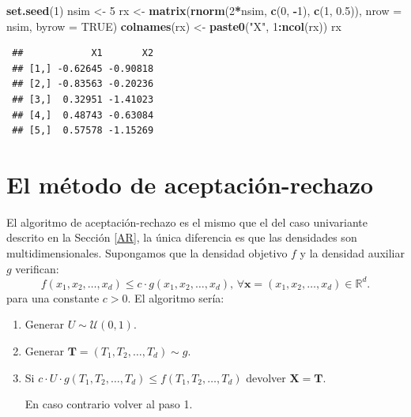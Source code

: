 \documentclass[
  spanish,
  10pt,
]{book}
\newenvironment{Shaded}{\begin{snugshade}}{\end{snugshade}}
\newcommand{\AttributeTok}[1]{\textcolor[rgb]{0.13,0.29,0.53}{#1}}
\newcommand{\ConstantTok}[1]{\textcolor[rgb]{0.56,0.35,0.01}{#1}}
\newcommand{\DecValTok}[1]{\textcolor[rgb]{0.00,0.00,0.81}{#1}}
\newcommand{\FloatTok}[1]{\textcolor[rgb]{0.00,0.00,0.81}{#1}}
\newcommand{\FunctionTok}[1]{\textcolor[rgb]{0.13,0.29,0.53}{\textbf{#1}}}
\newcommand{\NormalTok}[1]{#1}
\newcommand{\OtherTok}[1]{\textcolor[rgb]{0.56,0.35,0.01}{#1}}
\newcommand{\SpecialCharTok}[1]{\textcolor[rgb]{0.81,0.36,0.00}{\textbf{#1}}}
\newcommand{\StringTok}[1]{\textcolor[rgb]{0.31,0.60,0.02}{#1}}
\renewcommand{\mathbf}[1]{\symbf{#1}}
\theoremstyle{break}
\theoremstyle{nonumberplain}
\begin{document}
\begin{Shaded}
\begin{Highlighting}[]
\FunctionTok{set.seed}\NormalTok{(}\DecValTok{1}\NormalTok{)}
\NormalTok{nsim }\OtherTok{\textless{}{-}} \DecValTok{5}
\NormalTok{rx }\OtherTok{\textless{}{-}} \FunctionTok{matrix}\NormalTok{(}\FunctionTok{rnorm}\NormalTok{(}\DecValTok{2}\SpecialCharTok{*}\NormalTok{nsim, }\FunctionTok{c}\NormalTok{(}\DecValTok{0}\NormalTok{, }\SpecialCharTok{{-}}\DecValTok{1}\NormalTok{), }\FunctionTok{c}\NormalTok{(}\DecValTok{1}\NormalTok{, }\FloatTok{0.5}\NormalTok{)), }\AttributeTok{nrow =}\NormalTok{ nsim, }\AttributeTok{byrow =} \ConstantTok{TRUE}\NormalTok{)}
\FunctionTok{colnames}\NormalTok{(rx) }\OtherTok{\textless{}{-}} \FunctionTok{paste0}\NormalTok{(}\StringTok{"X"}\NormalTok{, }\DecValTok{1}\SpecialCharTok{:}\FunctionTok{ncol}\NormalTok{(rx))}
\NormalTok{rx}
\end{Highlighting}
\end{Shaded}

\begin{verbatim}
 ##            X1       X2
 ## [1,] -0.62645 -0.90818
 ## [2,] -0.83563 -0.20236
 ## [3,]  0.32951 -1.41023
 ## [4,]  0.48743 -0.63084
 ## [5,]  0.57578 -1.15269
\end{verbatim}

\section{El método de aceptación-rechazo}\label{AR-multi}

El algoritmo de aceptación-rechazo es el mismo que el del caso univariante descrito en la Sección \ref{AR}, la única diferencia es que las densidades son multidimensionales.
Supongamos que la densidad objetivo \(f\) y la densidad
auxiliar \(g\) verifican:
\[f\left( x_1,x_2,\ldots,x_d\right) \leq c\cdot g\left( x_1,x_2,\ldots,x_d\right) 
\text{, }\forall \mathbf{x} = \left( x_1,x_2,\ldots,x_d\right)\in \mathbb{R}^d\text{.}\]
para una constante \(c>0\).
El algoritmo sería:

\begin{enumerate}
\def\labelenumi{\arabic{enumi}.}
\item
  Generar \(U\sim \mathcal{U}\left( 0,1\right)\).
\item
  Generar \(\mathbf{T} = ( T_1, T_2, \ldots, T_d) \sim g\).
\item
  Si \(c \cdot U \cdot g( T_1, T_2, \ldots, T_d) \leq f( T_1, T_2, \ldots, T_d)\)
  devolver \(\mathbf{X}= \mathbf{T}\).

  En caso contrario volver al paso 1.
\end{enumerate}
\end{document}

